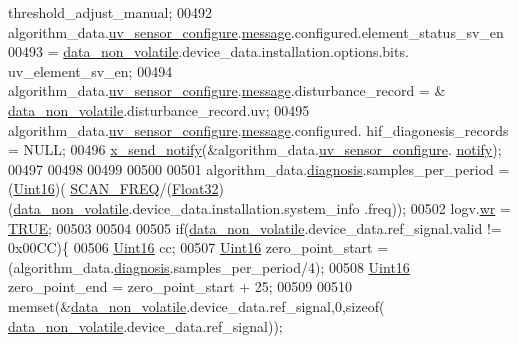 \begin{DoxyCode}
{{{{{      threshold\_adjust\_manual;
00492     algorithm\_data.\hyperlink{a00016_af1ff980a38b896c99e86279a3c67f00d}{uv\_sensor\_configure}.\hyperlink{a00018_a32952acc732e2f16aad59fe0804da5bf}{message}.configured.element\_status\_sv\_en
00493                    = \hyperlink{a00060_a76ac5f917f5308dcd83de0d7c94559fb}{data\_non\_volatile}.device\_data.installation.options.bits.
      uv\_element\_sv\_en;
00494      algorithm\_data.\hyperlink{a00016_af1ff980a38b896c99e86279a3c67f00d}{uv\_sensor\_configure}.\hyperlink{a00018_a32952acc732e2f16aad59fe0804da5bf}{message}.disturbance\_record = &
      \hyperlink{a00060_a76ac5f917f5308dcd83de0d7c94559fb}{data\_non\_volatile}.disturbance\_record.uv;
00495         algorithm\_data.\hyperlink{a00016_af1ff980a38b896c99e86279a3c67f00d}{uv\_sensor\_configure}.\hyperlink{a00018_a32952acc732e2f16aad59fe0804da5bf}{message}.configured.
      hif\_diagonesis\_records = NULL;
00496     \hyperlink{a00036_ae17b0bb16da3c471bb6074bb4c4d0fee}{x\_send\_notify}(&algorithm\_data.\hyperlink{a00016_af1ff980a38b896c99e86279a3c67f00d}{uv\_sensor\_configure}.
      \hyperlink{a00018_a8e6a04c2283f9fd7b8dcbc62faba5847}{notify});
00497 
00498 
00499 
00500 
00501     algorithm\_data.\hyperlink{a00016_a16f85d57ec98b4ad05f5a2e10536b3c6}{diagnosis}.samples\_per\_period       = (\hyperlink{a00072_a59a9f6be4562c327cbfb4f7e8e18f08b}{Uint16})(
      \hyperlink{a00021_a8127170b687c1f67a968886c128e76e4}{SCAN\_FREQ}/(\hyperlink{a00072_a87d38f886e617ced2698fc55afa07637}{Float32})(\hyperlink{a00060_a76ac5f917f5308dcd83de0d7c94559fb}{data\_non\_volatile}.device\_data.installation.system\_info
      .freq));
00502     logv.\hyperlink{a00021_a11ea0eda9ab27873198e7a5c4be4337d}{wr} = \hyperlink{a00040_aa8cecfc5c5c054d2875c03e77b7be15d}{TRUE};
00503 
00504 
00505     \textcolor{keywordflow}{if}(\hyperlink{a00060_a76ac5f917f5308dcd83de0d7c94559fb}{data\_non\_volatile}.device\_data.ref\_signal.valid != 0x00CC)\{
00506         \hyperlink{a00072_a59a9f6be4562c327cbfb4f7e8e18f08b}{Uint16} cc;
00507         \hyperlink{a00072_a59a9f6be4562c327cbfb4f7e8e18f08b}{Uint16} zero\_point\_start = (algorithm\_data.\hyperlink{a00016_a16f85d57ec98b4ad05f5a2e10536b3c6}{diagnosis}.samples\_per\_period/4);
00508         \hyperlink{a00072_a59a9f6be4562c327cbfb4f7e8e18f08b}{Uint16} zero\_point\_end   = zero\_point\_start + 25;
00509 
00510         memset(&\hyperlink{a00060_a76ac5f917f5308dcd83de0d7c94559fb}{data\_non\_volatile}.device\_data.ref\_signal,0,\textcolor{keyword}{sizeof}(
      \hyperlink{a00060_a76ac5f917f5308dcd83de0d7c94559fb}{data\_non\_volatile}.device\_data.ref\_signal));
}}}}}
\end{DoxyCode}
